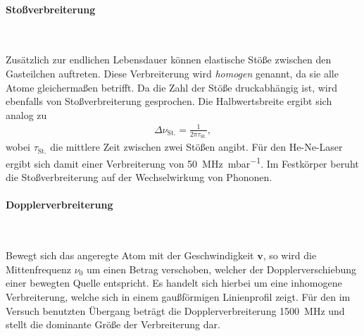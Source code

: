 \documentclass[a4paper,twoside,final]{article}
\begin{document}
\paragraph{Stoßverbreiterung}$~$

Zusätzlich zur endlichen Lebensdauer können elastische Stöße zwischen den Gasteilchen auftreten. Diese Verbreiterung wird \emph{homogen} genannt, da sie alle Atome gleichermaßen betrifft. Da die Zahl der Stöße druckabhängig ist, wird ebenfalls von Stoßverbreiterung gesprochen. Die Halbwertsbreite ergibt sich analog zu
\begin{align}
    \Delta \nu_\text{St.} = \frac{1}{2\pi \tau_\text{St.}},
\end{align}
wobei $\tau_\text{St.}$ die mittlere Zeit zwischen zwei Stößen angibt. Für den He-Ne-Laser ergibt sich damit einer Verbreiterung von \SI{50}{\mega\hertz\per\milli\bar}.
Im Festkörper beruht die Stoßverbreiterung auf der Wechselwirkung von Phononen.

\paragraph{Dopplerverbreiterung}$~$

Bewegt sich das angeregte Atom mit der Geschwindigkeit $\bm{v}$, so wird die Mittenfrequenz $\nu_0$ um einen Betrag verschoben, welcher der Dopplerverschiebung einer bewegten Quelle entspricht. Es handelt sich hierbei um eine inhomogene Verbreiterung, welche sich in einem gaußförmigen Linienprofil zeigt. Für den im Versuch benutzten Übergang beträgt die Dopplerverbreiterung \SI{1500}{\mega\hertz} und stellt die dominante Größe der Verbreiterung dar.
\end{document}
